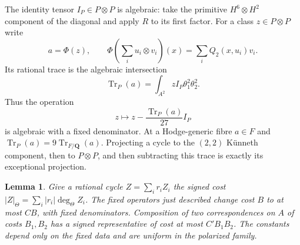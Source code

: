 \documentclass[11pt]{article}
\newtheorem{lemma}[theorem]{Lemma}
\theoremstyle{definition}
\theoremstyle{remark}
\newcommand{\Q}{\mathbf Q}
\begin{document}
The identity tensor $I_P\in P\otimes P$ is algebraic: take the primitive
$H^6\otimes H^2$ component of the diagonal and apply $R$ to its first
factor. For a class $z\in P\otimes P$ write
\[
 a=\Phi(z),\qquad
 \Phi\left(\sum_i u_i\otimes v_i\right)(x)
   =\sum_i Q_2(x,u_i)v_i.
\]
Its rational trace is the algebraic intersection
\[
 \operatorname{Tr}_{P}(a)
   =\int_{A^2}zI_P\theta_1^2\theta_2^2.
\]
Thus the operation
\begin{equation}\label{eq:mumford-trace}
 z\longmapsto z-\frac{\operatorname{Tr}_{P}(a)}{27}I_P
\end{equation}
is algebraic with a fixed denominator. At a Hodge-generic fibre
$a\in F$ and $\operatorname{Tr}_{P}(a)=9\operatorname{Tr}_{F/\Q}(a)$.
Projecting a cycle to the $(2,2)$ K\"unneth component, then to
$P\otimes P$, and then subtracting this trace is exactly its
exceptional projection.

\begin{lemma}\label{lem:mumford-cost}
Give a rational cycle $Z=\sum_i r_iZ_i$ the signed cost
$|Z|_\Theta=\sum_i|r_i|\deg_\Theta Z_i$.
The fixed operators just described change cost $B$ to at most $CB$,
with fixed denominators. Composition of two correspondences on $A$
of costs $B_1,B_2$ has a signed representative of cost at most
$C'B_1B_2$. The constants depend only on the fixed data and are uniform
in the polarized family.
\end{lemma}
\end{document}
